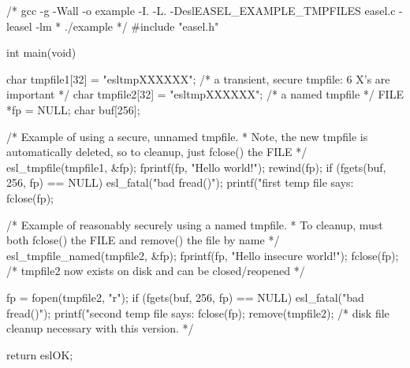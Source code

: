 \begin{cchunk}
/* gcc -g -Wall -o example -I. -L. -DeslEASEL_EXAMPLE_TMPFILES easel.c -leasel -lm
 * ./example
 */
#include "easel.h"

int main(void)
{
  char  tmpfile1[32]  = "esltmpXXXXXX"; /* a transient, secure tmpfile: 6 X's are important */
  char  tmpfile2[32]  = "esltmpXXXXXX"; /* a named tmpfile                                  */
  FILE *fp            = NULL;
  char  buf[256];

  /* Example of using a secure, unnamed tmpfile. 
   * Note, the new tmpfile is automatically deleted, so to cleanup, just fclose() the FILE */
  esl_tmpfile(tmpfile1, &fp);
  fprintf(fp, "Hello world!\n");
  rewind(fp);
  if (fgets(buf, 256, fp) == NULL) esl_fatal("bad fread()");
  printf("first temp file says: %
  fclose(fp);

  /* Example of reasonably securely using a named tmpfile. 
   * To cleanup, must both fclose() the FILE and remove() the file by name */
  esl_tmpfile_named(tmpfile2, &fp);
  fprintf(fp, "Hello insecure world!\n");
  fclose(fp);		/* tmpfile2 now exists on disk and can be closed/reopened */

  fp = fopen(tmpfile2, "r");
  if (fgets(buf, 256, fp) == NULL) esl_fatal("bad fread()");
  printf("second temp file says: %
  fclose(fp);
  remove(tmpfile2);	/* disk file cleanup necessary with this version. */

  return eslOK;
}
\end{cchunk}

